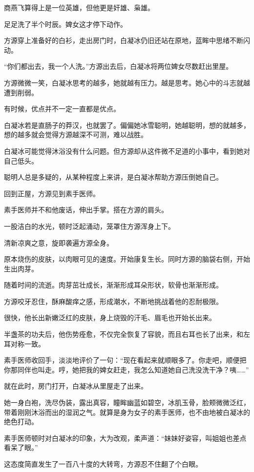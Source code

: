 \begin{this_body}
商燕飞算得上是一位英雄，但他更是奸雄、枭雄。

足足洗了半个时辰。婢女这才停下动作。

方源穿上准备好的白衫，走出房门时，白凝冰仍旧还站在原地，蓝眸中思绪不断闪动。

“你们都出去，我一个人洗。”方源出去后，白凝冰将两位婢女尽数赶出里屋。

方源微微一笑，白凝冰思考的越多，她就越有压力。越是思考。她心中的斗志就越遭到削弱。

有时候，优点并不一定一直都是优点。

白凝冰若是直肠子的莽汉，也就罢了。偏偏她冰雪聪明，她越聪明，想的就越多，想的越多就会觉得方源越深不可测，难以战胜。

白凝冰可能觉得沐浴没有什么问题。但方源却从这件微不足道的小事中，看到她对自己低头。

聪明人总是多疑的，从某种程度上来讲，是白凝冰帮助方源压倒她自己。

回到正屋，方源见到素手医师。

素手医师并不和他废话，伸出手掌。搭在方源的肩头。

一股洁白的水光，顿时泛起涌动，笼罩住方源浑身上下。

清新凉爽之意，旋即袭遍方源全身。

原本烧伤的皮肤，以肉眼可见的速度。开始康复生长。同时方源的脑袋右侧，开始生出肉芽。

随着时间的流逝。肉芽茁壮成长，渐渐形成耳朵形状，软骨也渐渐形成。

方源咬牙忍住，酥麻酸痒之感，形成潮水，不断地挑战着他的忍耐极限。

很快，他长出新嫩泛红的皮肤，身上烧毁的汗毛、眉毛也开始长出来。

半盏茶的功夫后，他伤势痊愈，不仅完全恢复了容貌，而且右耳也长了出来，和左耳对称一致。

素手医师收回手，淡淡地评价了一句：“现在看起来就顺眼多了。你走吧，顺便把你那同伴也叫走。哼，她把我的婢女赶走，我怎么知道她自己洗没洗干净？咦……”

就在此时，房门打开，白凝冰从里屋走了出来。

她一身白袍，洗尽伪装，露出真容，瞳眸幽蓝如碧空，冰肌玉骨，脸颊微微泛红，带着刚刚沐浴而出的湿润之气。就算是身为女子的素手医师，也不由地被白凝冰的绝色打动。

素手医师顿时对白凝冰的印象，大为改观，柔声道：“妹妹好姿容，叫姐姐也差点看呆了眼。”

这态度简直发生了一百八十度的大转弯，方源忍不住翻了个白眼。


\end{this_body}
